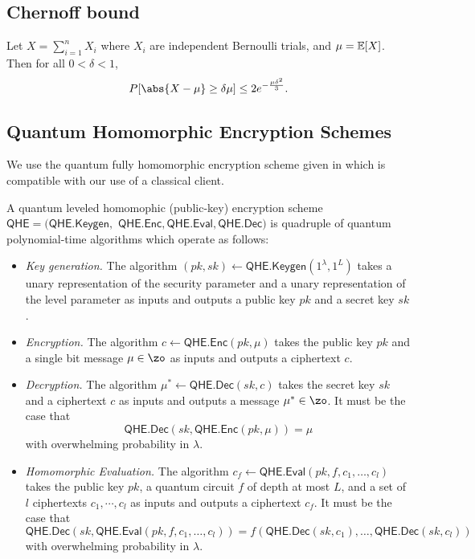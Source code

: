 \fi

\subsection{Chernoff bound}

\begin{thm}
\label{thm:Chernoff}
Let $X=\sum_{i=1}^n X_i$ where $X_i$ are independent Bernoulli trials, and $\mu=\operatorname*{\mathbb{E}}[X]$.
Then for all $0<\delta<1$,
$$P[\abs{X-\mu}\geq\delta\mu]\leq2e^{-\frac{\mu\delta^2}{3}}.$$
\end{thm}

\subsection{Quantum Homomorphic Encryption Schemes}

\def\QHE{\mathsf{QHE}}
\def\QGen{\mathsf{QHE.Keygen}}
\def\QEnc{\mathsf{QHE.Enc}}
\def\QEval{\mathsf{QHE.Eval}}
\def\QDec{\mathsf{QHE.Dec}}

We use the quantum fully homomorphic encryption scheme given in \cite{mahadev_qfhe} which is compatible with our use of a classical client.
\begin{definition}
	A quantum leveled homomophic (public-key) encryption scheme $\QHE=(\QGen,$ \linebreak
	$\QEnc, \QEval, \QDec)$ is quadruple of quantum polynomial-time algorithms which operate as follows:
	\begin{itemize}
		\item \emph{Key generation.}
			The algorithm $(pk, sk)\leftarrow\QGen(1^\lambda, 1^L)$ takes a unary representation of the security parameter and a unary representation of the level parameter as inputs and outputs a public key $pk$ and a secret key $sk$.
		\item \emph{Encryption.}
			The algorithm $c\leftarrow\QEnc(pk, \mu)$ takes the public key $pk$ and a single bit message $\mu\in\zo$ as inputs and outputs a ciphertext $c$.
		\item \emph{Decryption.}
			The algorithm $\mu^*\leftarrow\QDec(sk, c)$ takes the secret key $sk$ and a ciphertext $c$ as inputs and outputs a message $\mu^*\in\zo$.
			It must be the case that
				$$\QDec(sk, \QEnc(pk, \mu))=\mu$$
			with overwhelming probability in $\lambda$.
		\item \emph{Homomorphic Evaluation.}
			The algorithm $c_f\leftarrow\QEval(pk, f, c_1, \ldots, c_l)$ takes the public key $pk$, a quantum circuit $f$ of depth at most $L$, and a set of $l$ ciphertexts $c_1,\cdots,c_l$ as inputs and outputs a ciphertext $c_f$.
			It must be the case that
				$$\QDec(sk, \QEval(pk, f, c_1, \ldots, c_l))=f(\QDec(sk, c_1),\ldots,\QDec(sk, c_l))$$
			with overwhelming probability in $\lambda$.
	\end{itemize}
\end{definition}

